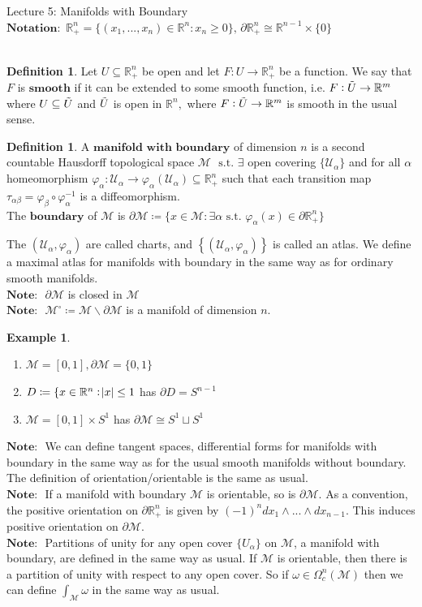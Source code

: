 \documentclass[10pt]{article}
\theoremstyle{plain}
\theoremstyle{definition}
\newtheorem{defn}[thm]{Definition} %
\newtheorem{exmp}[thm]{Example} %
\newcommand{\st}{\text{ s.t. }}
\newcommand{\Notation}{\textbf{Notation: }}
\newcommand{\Note}{\textbf{Note: }}
\newcommand{\Real}{\mathbb{R}}
\newcommand{\man}{\mathcal{M}}
\newcommand{\chartU}{\mathcal{U}}
\newcommand{\chart}{\varphi}
\newcommand{\alphaatlas}{\left\{(\chartU_\alpha,\chart_\alpha)\right\}}
\newcommand{\trans}{\tau_{\alpha\beta}}
\newcommand{\xman}{x\in\man}
\newcommand{\allthe}[3]{{#1}_{#2},...,{#1}_{#3}}
\newcommand{\allthewedge}[3]{{#1}_{#2}\wedge...\wedge{#1}_{#3}}
\newcommand{\compactpformman}[1]{\Omega^{#1}_c(\man)}
\newcommand{\dx}{dx}
\newcommand{\plusReal}{\Real_+ ^n}
\begin{document}
\begin{section}{Lecture 5: Manifolds with Boundary}
$\Notation \, \Real_+ ^n = \{(\allthe{x}{1}{n})\in \Real^n : x_n \geq 0\},\, \partial \plusReal \cong \Real ^{n-1} \times \{0\}$\\\\
\begin{defn}
Let $U \subseteq\plusReal$ be open and let $ F : U \to \plusReal$ be a function. We say that $F$ is $\textbf{smooth}$ if it can be extended to some smooth function, i.e. $F : \Tilde{U}\to \Real^m$ where $U \subseteq \Tilde{U}$ and $\Tilde{U}$ is open in $\Real^n,$ where $F : \Tilde{U} \to \Real^m$ is smooth in the usual sense.
\end{defn}
\begin{defn}
A $\textbf{manifold with boundary}$ of dimension $n$ is a second countable Hausdorff topological space $\man$ $\st \exists $ open covering $\{\chartU_\alpha\}$ and for all $\alpha $ homeomorphism $\chart_\alpha : \chartU_\alpha \to \chart_\alpha(\chartU_\alpha) \subseteq \plusReal$ such that each transition map $\trans  = \chart_\beta \circ \chart_\alpha ^{-1}$ is a diffeomorphism.\\
The $\textbf{boundary}$ of $\man$ is $\partial \man \coloneqq \{\xman : \exists \alpha \st \chart_\alpha(x) \in \partial \plusReal\}$
\end{defn}
The $(\chartU_\alpha,\chart_\alpha)$ are called charts, and $\alphaatlas$ is called an atlas. We define a maximal atlas for manifolds with boundary in the same way as for ordinary smooth manifolds.\\
$\Note$ $\partial\man$ is closed in $\man$\\
$\Note$ $\man^\circ \coloneqq \man \backslash \partial \man$ is a manifold of dimension $n$.\\
\begin{exmp}
\begin{enumerate}
    \item $\man = [0,1], \partial \man = \{0,1\}$
    \item $D \coloneqq \{ x\in\Real^n : \abs{x} \leq 1$ has $\partial D = S^{n-1}$
    \item $\man = [0,1] \times S^1$ has $\partial\man \cong S^1\sqcup S^1$
\end{enumerate}
\end{exmp}\noindent
$\Note$ We can define tangent spaces, differential forms for manifolds with boundary in the same way as for the usual smooth manifolds without boundary. The definition of orientation/orientable is the same as usual. \\
$\Note$ If a manifold with boundary $\man$ is orientable, so is $\partial \man$. As a convention, the positive orientation on $\partial\plusReal$ is given by $(-1)^n \allthewedge{\dx}{1}{n-1}.$ This induces positive orientation on $\partial \man$.\\
$\Note$ Partitions of unity for any open cover $\{U_\alpha\}$ on $\man$, a manifold with boundary, are defined in the same way as usual. If $\man$ is orientable, then there is a partition of unity with respect to any open cover. So if $\omega \in \compactpformman{n}$ then we can define $\int_\man \omega$ in the same way as usual.
\end{section}
\end{document}
